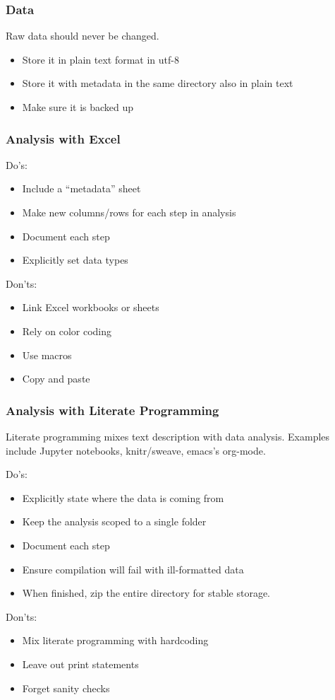 \documentclass[10pt, compress]{beamer}
\begin{document}
\begin{frame}[fragile]
  \frametitle{Data}
  Raw data should never be changed.

  \begin{itemize}
  \item Store it in plain text format in utf-8
  \item Store it with metadata in the same directory also in plain text
    \item Make sure it is backed up
  \end{itemize}
\end{frame}


\begin{frame}[fragile]
  \frametitle{Analysis with Excel}
  Do's:
  \begin{itemize}
  \item Include a ``metadata'' sheet
  \item Make new columns/rows for each step in analysis
  \item Document each step
  \item Explicitly set data types
  \end{itemize}
  Don'ts:
  \begin{itemize}
  \item Link Excel workbooks or sheets
  \item Rely on color coding
  \item Use macros
   \item Copy and paste
  \end{itemize}
\end{frame}

\begin{frame}[fragile]
  \frametitle{Analysis with Literate Programming}
  Literate programming mixes text description with data analysis.  Examples include Jupyter notebooks, knitr/sweave, emacs's org-mode.

  Do's:
  \begin{itemize}
  \item Explicitly state where the data is coming from
  \item Keep the analysis scoped to a single folder
  \item Document each step
    \item Ensure compilation will fail with ill-formatted data
  \item When finished, zip the entire directory for stable storage.
  \end{itemize}
  Don'ts:
  \begin{itemize}
  \item Mix literate programming with hardcoding
  \item Leave out print statements
  \item Forget sanity checks
  \end{itemize}
\end{frame}
\end{document}
